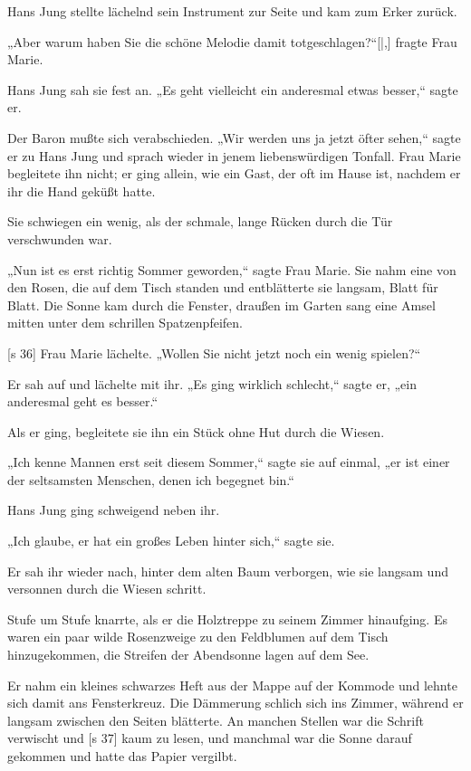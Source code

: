 Hans Jung stellte lächelnd sein Instrument zur
Seite und kam zum Erker zurück.

„Aber warum haben Sie die schöne Melodie
damit totgeschlagen?“[|,] fragte Frau Marie.

Hans Jung sah sie fest an. „Es geht vielleicht
ein anderesmal etwas besser,“ sagte er.

Der Baron mußte sich verabschieden. „Wir
werden uns ja jetzt öfter sehen,“ sagte er zu Hans
Jung und sprach wieder in jenem liebenswürdigen
Tonfall. Frau Marie begleitete ihn nicht; er ging
allein, wie ein Gast, der oft im Hause ist, nachdem
er ihr die Hand geküßt hatte.

Sie schwiegen ein wenig, als der schmale, lange
Rücken durch die Tür verschwunden war.

„Nun ist es erst richtig Sommer geworden,“
sagte Frau Marie. Sie nahm eine von den Rosen,
die auf dem Tisch standen und entblätterte sie langsam,
Blatt für Blatt. Die Sonne kam durch die Fenster,
draußen im Garten sang eine Amsel mitten unter
dem schrillen Spatzenpfeifen.

[s 36]
Frau Marie lächelte. „Wollen Sie nicht jetzt
noch ein wenig spielen?“

Er sah auf und lächelte mit ihr. „Es ging
wirklich schlecht,“ sagte er, „ein anderesmal geht es
besser.“

Als er ging, begleitete sie ihn ein Stück ohne
Hut durch die Wiesen.

„Ich kenne Mannen erst seit diesem Sommer,“
sagte sie auf einmal, „er ist einer der seltsamsten
Menschen, denen ich begegnet bin.“

Hans Jung ging schweigend neben ihr.

„Ich glaube, er hat ein großes Leben hinter sich,“
sagte sie.

Er sah ihr wieder nach, hinter dem alten Baum
verborgen, wie sie langsam und versonnen durch die
Wiesen schritt.

Stufe um Stufe knarrte, als er die Holztreppe
zu seinem Zimmer hinaufging. Es waren ein paar
wilde Rosenzweige zu den Feldblumen auf dem Tisch
hinzugekommen, die Streifen der Abendsonne lagen
auf dem See.

Er nahm ein kleines schwarzes Heft aus der
Mappe auf der Kommode und lehnte sich damit ans
Fensterkreuz. Die Dämmerung schlich sich ins Zimmer,
während er langsam zwischen den Seiten blätterte.
An manchen Stellen war die Schrift verwischt und
[s 37]
kaum zu lesen, und manchmal war die Sonne darauf
gekommen und hatte das Papier vergilbt.

